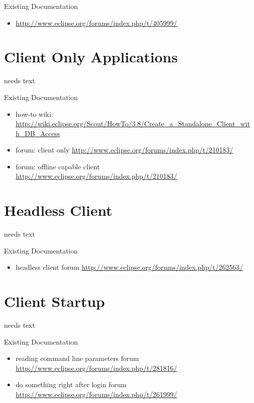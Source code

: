 \documentclass[a4paper,10pt,twoside]{book}
\begin{document}
\noindent Existing Documentation
\begin{itemize}
  \item \url{http://www.eclipse.org/forums/index.php/t/405999/}
\end{itemize}

\section{Client Only Applications}
needs text

\noindent Existing Documentation
\begin{itemize}
  \item how-to wiki: \url{http://wiki.eclipse.org/Scout/HowTo/3.8/Create_a_Standalone_Client_with_DB_Access}
  \item forum: client only \url{http://www.eclipse.org/forums/index.php/t/210183/}
  \item forum: offline capable client \url{http://www.eclipse.org/forums/index.php/t/210183/}
\end{itemize}


\section{Headless Client}
needs text

\noindent Existing Documentation
\begin{itemize}
  \item headless client forum \url{http://www.eclipse.org/forums/index.php/t/262563/}
\end{itemize}

\section{Client Startup}
needs text

\noindent Existing Documentation
\begin{itemize}
  \item reading command line parameters forum \url{http://www.eclipse.org/forums/index.php/t/281816/}
  \item do something right after login forum \url{http://www.eclipse.org/forums/index.php/t/261999/}
\end{itemize}
\end{document}
